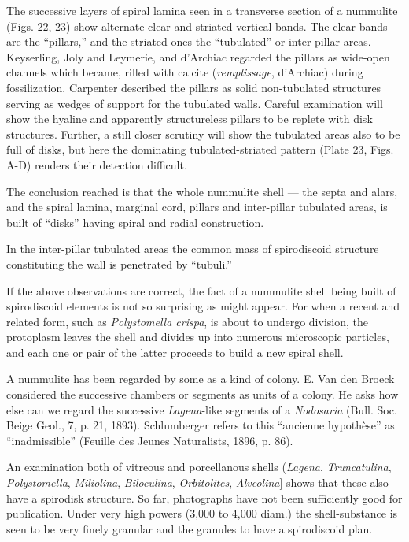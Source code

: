 \documentclass[a4paper, 12pt, oneside]{article}
\begin{document}
The successive layers of spiral lamina seen in a transverse section of a nummulite (Figs. 22, 23) show alternate clear and striated vertical bands. The clear bands are the ``pillars,'' and the striated ones the ``tubulated'' or inter-pillar areas. Keyserling, Joly and Leymerie, and d'Archiac regarded the pillars as wide-open channels which became, rilled with calcite (\emph{remplissage}, d'Archiac) during fossilization. Carpenter described the pillars as solid non-tubulated structures serving as wedges of support for the tubulated walls. Careful examination will show the hyaline and apparently structureless pillars to be replete with disk structures. Further, a still closer scrutiny will show the tubulated areas also to be full of disks, but here the dominating tubulated-striated pattern (Plate 23, Figs. A-D) renders their detection difficult.

The conclusion reached is that the whole nummulite shell --- the septa and alars, and the spiral lamina, marginal cord, pillars and inter-pillar tubulated areas, is built of ``disks'' having spiral and radial construction.

In the inter-pillar tubulated areas the common mass of spirodiscoid structure constituting the wall is penetrated by ``tubuli.''

If the above observations are correct, the fact of a nummulite shell being built of spirodiscoid elements is not so surprising as might appear. For when a recent and related form, such as \emph{Polystomella crispa}, is about to undergo division, the protoplasm leaves the shell and divides up into numerous microscopic particles, and each one or pair of the latter proceeds to build a new spiral shell.

A nummulite has been regarded by some as a kind of colony. E. Van den Broeck considered the successive chambers or segments as units of a colony. He asks how else can we regard the successive \emph{Lagena}-like segments of a \emph{Nodosaria} (Bull. Soc. Beige Geol., 7, p. 21, 1893). Schlumberger refers to this ``ancienne hypothèse'' as ``inadmissible'' (Feuille des Jeunes Naturalists, 1896, p. 86).

An examination both of vitreous and porcellanous shells (\emph{Lagena}, \emph{Truncatulina}, \emph{Polystomella}, \emph{Miliolina}, \emph{Biloculina}, \emph{Orbitolites}, \emph{Alveolina}] shows that these also have a spirodisk structure. So far, photographs have not been sufficiently good for publication. Under very high powers (3,000 to 4,000 diam.) the shell-substance is seen to be very finely granular and the granules to have a spirodiscoid plan.
\end{document}
